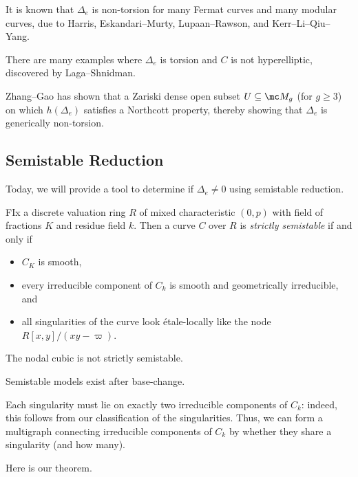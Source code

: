 \documentclass{article}
\begin{document}
\begin{example}
	It is known that $\Delta_e$ is non-torsion for many Fermat curves and many modular curves, due to Harris, Eskandari--Murty, Lupaan--Rawson, and Kerr--Li--Qiu--Yang.
\end{example}
\begin{example}
	There are many examples where $\Delta_e$ is torsion and $C$ is not hyperelliptic, discovered by Laga--Shnidman.
\end{example}
\begin{example}
	Zhang--Gao has shown that a Zariski dense open subset $U\subseteq\mc M_g$ (for $g\ge3$) on which $h(\Delta_e)$ satisfies a Northcott property, thereby showing that $\Delta_e$ is generically non-torsion.
\end{example}

\subsection{Semistable Reduction}
Today, we will provide a tool to determine if $\Delta_e\ne0$ using semistable reduction.
\begin{definition}
	FIx a discrete valuation ring $R$ of mixed characteristic $(0,p)$ with field of fractions $K$ and residue field $k$. Then a curve $C$ over $R$ is \textit{strictly semistable} if and only if
	\begin{itemize}
		\item $C_K$ is smooth,
		\item every irreducible component of $C_k$ is smooth and geometrically irreducible, and
		\item all singularities of the curve look \'etale-locally like the node $R[x,y]/(xy-\varpi)$.
	\end{itemize}
\end{definition}
\begin{example}
	The nodal cubic is not strictly semistable.
\end{example}
\begin{remark}
	Semistable models exist after base-change.
\end{remark}
\begin{remark}
	Each singularity must lie on exactly two irreducible components of $C_k$: indeed, this follows from our classification of the singularities. Thus, we can form a multigraph connecting irreducible components of $C_k$ by whether they share a singularity (and how many).
\end{remark}
Here is our theorem.
\end{document}
